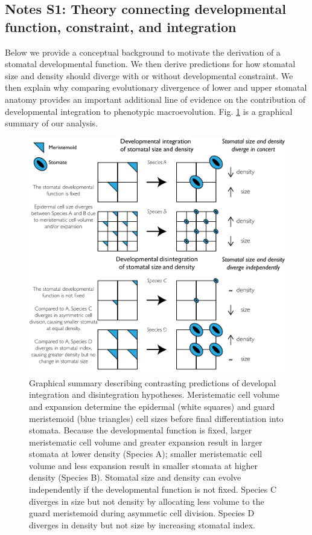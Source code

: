 \documentclass[
  12pt,
]{article}
\begin{document}
\clearpage

\hypertarget{notes-s1-theory-connecting-developmental-function-constraint-and-integration}{%
\subsection{Notes S1: Theory connecting developmental function, constraint, and integration}\label{notes-s1-theory-connecting-developmental-function-constraint-and-integration}}

Below we provide a conceptual background to motivate the derivation of a stomatal developmental function. We then derive predictions for how stomatal size and density should diverge with or without developmental constraint. We then explain why comparing evolutionary divergence of lower and upper stomatal anatomy provides an important additional line of evidence on the contribution of developmental integration to phenotypic macroevolution. Fig. \ref{fig:developmental-integration} is a graphical summary of our analysis.

\begin{figure}[ht]
\includegraphics[width=\textwidth]{../figures/developmental-integration.pdf}
\caption{Graphical summary describing contrasting predictions of developal integration and disintegration hypotheses. Meristematic cell volume and expansion determine the epidermal (white squares) and guard meristemoid (blue triangles) cell sizes before final differentiation into stomata. Because the developmental function is fixed, larger meristematic cell volume and greater expansion result in larger stomata at lower density (Species A); smaller meristematic cell volume and less expansion result in smaller stomata at higher density (Species B). Stomatal size and density can evolve independently if the developmental function is not fixed. Species C diverges in size but not density by allocating less volume to the guard meristemoid during asymmetic cell division. Species D diverges in density but not size by increasing stomatal index.}
\label{fig:developmental-integration}
\end{figure}
\end{document}
